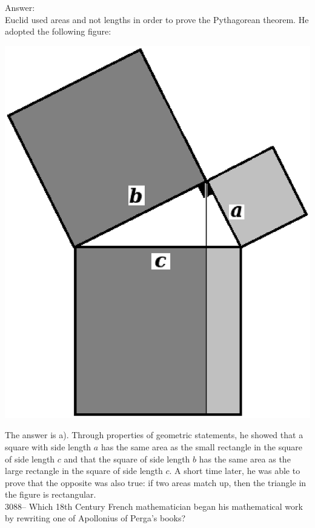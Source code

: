 \documentclass[letterpaper, 12pt]{article}
\begin{document}
Answer:\\
Euclid used areas and not lengths in order to prove the Pythagorean theorem. He adopted the following figure:\\
\begin{center}
\includegraphics[scale=0.3]{pyth_euclide2.eps}\\
\end{center}

The answer is a). Through properties of geometric statements, he showed that a square with side length $a$ has the same area as the small rectangle in the square of side length $c$ and that the square of side length $b$ has the same area as the large rectangle in the square of side length $c$.  A short time later, he was able to prove that the opposite was also true: if two areas match up, then the triangle in the figure is rectangular.\\



3088-- Which 18th Century French mathematician began his mathematical work by rewriting one of Apollonius of Perga's books?\\
\end{document}
